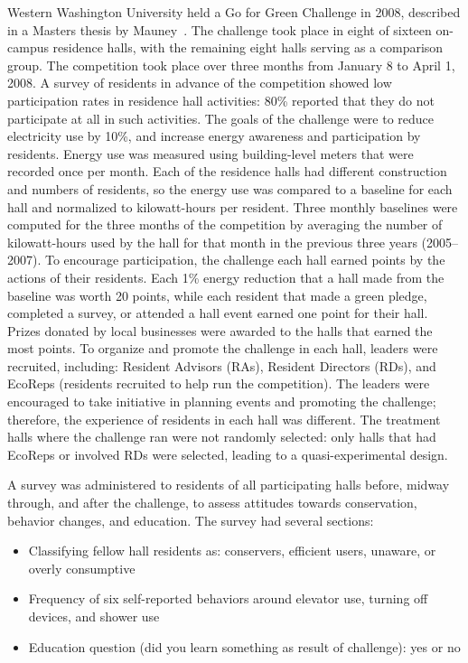 Western Washington University held a Go for Green Challenge in 2008, described in a Masters thesis by Mauney~\cite{Mauney-thesis}. The challenge took place in eight of sixteen on-campus residence halls, with the remaining eight halls serving as a comparison group. The competition took place over three months from January 8 to April 1, 2008. A survey of residents in advance of the competition showed low participation rates in residence hall activities: 80\% reported that they do not participate at all in such activities. The goals of the challenge were to reduce electricity use by 10\%, and increase energy awareness and participation by residents. Energy use was measured using building-level meters that were recorded once per month. Each of the residence halls had different construction and numbers of residents, so the energy use was compared to a baseline for each hall and normalized to kilowatt-hours per resident. Three monthly baselines were computed for the three months of the competition by averaging the number of kilowatt-hours used by the hall for that month in the previous three years (2005--2007). To encourage participation, the challenge each hall earned points by the actions of their residents. Each 1\% energy reduction that a hall made from the baseline was worth 20 points, while each resident that made a green pledge, completed a survey, or attended a hall event earned one point for their hall. Prizes donated by local businesses were awarded to the halls that earned the most points. To organize and promote the challenge in each hall, leaders were recruited, including: Resident Advisors (RAs), Resident Directors (RDs), and EcoReps (residents recruited to help run the competition). The leaders were encouraged to take initiative in planning events and promoting the challenge; therefore, the experience of residents in each hall was different. The treatment halls where the challenge ran were not randomly selected: only halls that had EcoReps or involved RDs were selected, leading to a quasi-experimental design.

A survey was administered to residents of all participating halls before, midway through, and after the challenge, to assess attitudes towards conservation, behavior changes, and education. The survey had several sections:

\begin{itemize}
	\item Classifying fellow hall residents as: conservers, efficient users, unaware, or overly consumptive
	\item Frequency of six self-reported behaviors around elevator use, turning off devices, and shower use
	\item Education question (did you learn something as result of challenge): yes or no
\end{itemize}

